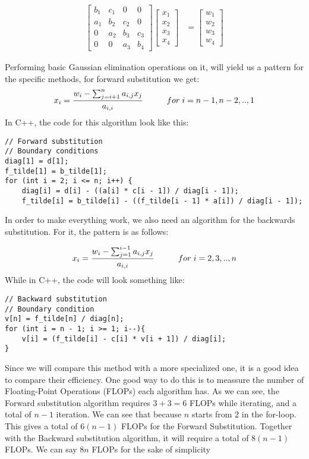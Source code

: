 \documentclass{article}
\begin{document}
\begin{align*}
  \begin{bmatrix}
      b_1 & c_1 & 0   & 0   \\
      a_1 & b_2 & c_2 & 0   \\
      0   & a_2 & b_3 & c_3 \\
      0   & 0   & a_3 & b_4
  \end{bmatrix}
  \begin{bmatrix} x_1 \\ x_2 \\ x_3 \\ x_4 \end{bmatrix}
    &=
  \begin{bmatrix} w_1 \\ w_2 \\ w_3 \\ w_4 \end{bmatrix}
\end{align*}

Performing basic Gaussian elimination operations on it, will yield us a pattern for the specific methods, for forward substitution we get:
\begin{align*}
{x}_i = \frac{w_i -\sum_{j=i + 1}^{n} a_{i,j}x_{j}}    {{a}_{i,i}} \hspace{1.0cm} for\hspace{0.1cm}i=n-1, n-2,..,1
\end{align*}
In C++, the code for this algorithm look like this:
\begin{lstlisting}
// Forward substitution
// Boundary conditions
diag[1] = d[1];
f_tilde[1] = b_tilde[1];
for (int i = 2; i <= n; i++) {
    diag[i] = d[i] - ((a[i] * c[i - 1]) / diag[i - 1]);
    f_tilde[i] = b_tilde[i] - ((f_tilde[i - 1] * a[i]) / diag[i - 1]);
\end{lstlisting}
In order to make everything work, we also need an algorithm for the backwards substitution. For it, the pattern is as follows:

\begin{align*}
{x}_i = \frac{ w_i -\sum_{j=1}^{i-1} a_{i,j}x_{j}}    {{a}_{i,i}} \hspace{1.0cm} for\hspace{0.1cm}i=2, 3,..,n
\end{align*}
While in C++, the code will look something like:
\begin{lstlisting}
// Backward substitution
// Boundary condition
v[n] = f_tilde[n] / diag[n];
for (int i = n - 1; i >= 1; i--){
    v[i] = (f_tilde[i] - c[i] * v[i + 1]) / diag[i];
}
\end{lstlisting}
Since we will compare this method with a more specialized one, it is a good idea to compare their efficiency. One good way to do this is to meassure the number of Floating-Point Operations (FLOPs) each algorithm has.
\newline
As we can see, the Forward substitution algorithm requires $3 + 3 = 6$ FLOPs while iterating, and a total of $n-1$ iteration. We can see that because $n$ starts from $2$ in the for-loop. This gives a total of $6(n-1)$ FLOPs for the Forward Substitution. Together with the Backward substitution algorithm, it will require a total of $8(n-1)$ FLOPs. We can say $8n$ FLOPs for the sake of simplicity 
\end{document}
